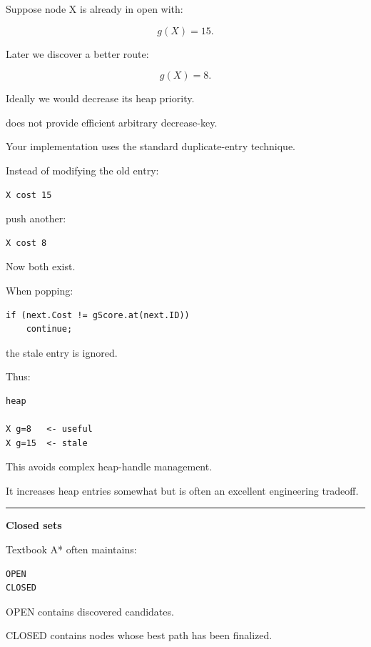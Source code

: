 Suppose node X is already in open with:

\[
g(X)=15.
\]

Later we discover a better route:

\[
g(X)=8.
\]

Ideally we would decrease its heap priority.

 does not provide efficient arbitrary decrease-key.

Your implementation uses the standard duplicate-entry technique.

Instead of modifying the old entry:

\begin{verbatim}
X cost 15
\end{verbatim}

push another:

\begin{verbatim}
X cost 8
\end{verbatim}

Now both exist.

When popping:

\begin{verbatim}
if (next.Cost != gScore.at(next.ID))
    continue;
\end{verbatim}

the stale entry is ignored.

Thus:

\begin{verbatim}
heap

X g=8   <- useful
X g=15  <- stale
\end{verbatim}

This avoids complex heap-handle management.

It increases heap entries somewhat but is often an excellent engineering tradeoff.

\begin{center}\rule{0.5\linewidth}{0.5pt}\end{center}

\textbf{Closed sets}

Textbook A* often maintains:

\begin{verbatim}
OPEN
CLOSED
\end{verbatim}

OPEN contains discovered candidates.

CLOSED contains nodes whose best path has been finalized.

